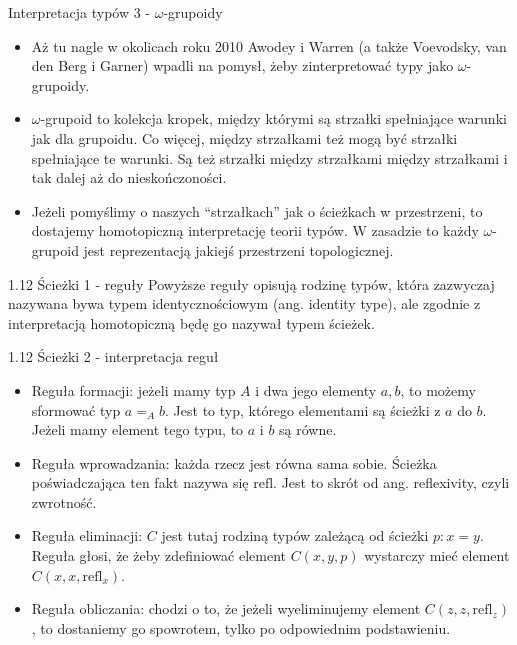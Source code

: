 \documentclass{beamer}
\newcommand{\refl}[1]{\text{refl}_{#1}}
\begin{document}
\begin{frame}{Interpretacja typów 3 - $\omega$-grupoidy}
\begin{itemize}
	\item Aż tu nagle w okolicach roku 2010 Awodey i Warren (a także Voevodsky, van den Berg i Garner) wpadli na pomysł, żeby zinterpretować typy jako $\omega$-grupoidy.
	\item $\omega$-grupoid to kolekcja kropek, między którymi są strzałki spełniające warunki jak dla grupoidu. Co więcej, między strzałkami też mogą być strzałki spełniające te warunki. Są też strzałki między strzałkami między strzałkami i tak dalej aż do nieskończoności.
	\item Jeżeli pomyślimy o naszych ``strzałkach'' jak o ścieżkach w przestrzeni, to dostajemy homotopiczną interpretację teorii typów. W zasadzie to każdy $\omega$-grupoid jest reprezentacją jakiejś przestrzeni topologicznej.
\end{itemize}
\end{frame}

\begin{frame}{1.12 Ścieżki 1 - reguły}
Powyższe reguły opisują rodzinę typów, która zazwyczaj nazywana bywa typem identycznościowym (ang. identity type), ale zgodnie z interpretacją homotopiczną będę go nazywał typem ścieżek.
\end{frame}

\begin{frame}{1.12 Ścieżki 2 - interpretacja reguł}
\begin{itemize}
	\item Reguła formacji: jeżeli mamy typ $A$ i dwa jego elementy $a, b$, to możemy sformować typ $a =_A b$. Jest to typ, którego elementami są ścieżki z $a$ do $b$. Jeżeli mamy element tego typu, to $a$ i $b$ są równe.
	\item Reguła wprowadzania: każda rzecz jest równa sama sobie. Ścieżka poświadczająca ten fakt nazywa się $\text{refl}$. Jest to skrót od ang. reflexivity, czyli zwrotność.
	\item Reguła eliminacji: $C$ jest tutaj rodziną typów zależącą od ścieżki $p : x = y$. Reguła głosi, że żeby zdefiniować element $C(x, y, p)$ wystarczy mieć element $C(x, x, \refl{x})$.
	\item Reguła obliczania: chodzi o to, że jeżeli wyeliminujemy element $C(z, z, \refl{z})$, to dostaniemy go spowrotem, tylko po odpowiednim podstawieniu.
\end{itemize}
\end{frame}
\end{document}

